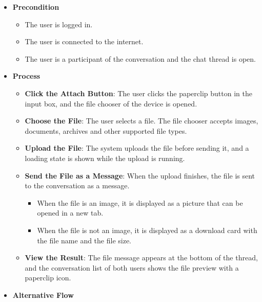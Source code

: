 \begin{itemize}[leftmargin=1.6em,topsep=4pt,itemsep=3pt,parsep=0pt,label=$\bullet$]
    \item \textbf{Precondition}

        \begin{itemize}[leftmargin=2.2em,topsep=2pt,itemsep=3pt,parsep=0pt,label=$\circ$]
            \item The user is logged in.
            \item The user is connected to the internet.
            \item The user is a participant of the conversation and the chat thread is open.
        \end{itemize}
    \item \textbf{Process}

        \begin{itemize}[leftmargin=2.2em,topsep=2pt,itemsep=3pt,parsep=0pt,label=$\circ$]
            \item \textbf{Click the Attach Button}: The user clicks the paperclip button in the input box, and the file chooser of the device is opened.
            \item \textbf{Choose the File}: The user selects a file. The file chooser accepts images, documents, archives and other supported file types.
            \item \textbf{Upload the File}: The system uploads the file before sending it, and a loading state is shown while the upload is running.
            \item \textbf{Send the File as a Message}: When the upload finishes, the file is sent to the conversation as a message.
                \begin{itemize}[leftmargin=2.2em,topsep=2pt,itemsep=3pt,parsep=0pt,label=$\blacksquare$]
                    \item When the file is an image, it is displayed as a picture that can be opened in a new tab.
                    \item When the file is not an image, it is displayed as a download card with the file name and the file size.
                \end{itemize}
            \item \textbf{View the Result}: The file message appears at the bottom of the thread, and the conversation list of both users shows the file preview with a paperclip icon.
        \end{itemize}
    \item \textbf{Alternative Flow}


\end{itemize}
